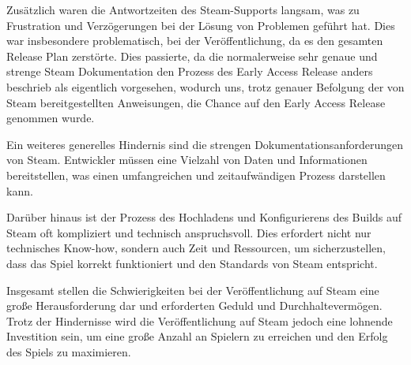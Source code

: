 Zusätzlich waren die Antwortzeiten des Steam-Supports langsam, was zu Frustration und Verzögerungen bei der Lösung von Problemen geführt hat.
Dies war insbesondere problematisch, bei der Veröffentlichung, da es den gesamten Release Plan zerstörte.
Dies passierte, da die normalerweise sehr genaue und strenge Steam Dokumentation den Prozess des Early Access Release anders beschrieb als eigentlich vorgesehen, wodurch uns, trotz genauer Befolgung der von Steam bereitgestellten Anweisungen, die Chance auf den Early Access Release genommen wurde.

Ein weiteres generelles Hindernis sind die strengen Dokumentationsanforderungen von Steam.
Entwickler müssen eine Vielzahl von Daten und Informationen bereitstellen, was einen umfangreichen und zeitaufwändigen Prozess darstellen kann.

Darüber hinaus ist der Prozess des Hochladens und Konfigurierens des Builds auf Steam oft kompliziert und technisch anspruchsvoll.
Dies erfordert nicht nur technisches Know-how, sondern auch Zeit und Ressourcen, um sicherzustellen, dass das Spiel korrekt funktioniert und den Standards von Steam entspricht.

Insgesamt stellen die Schwierigkeiten bei der Veröffentlichung auf Steam eine große Herausforderung dar und erforderten Geduld und Durchhaltevermögen.
Trotz der Hindernisse wird die Veröffentlichung auf Steam jedoch eine lohnende Investition sein, um eine große Anzahl an Spielern zu erreichen und den Erfolg des Spiels zu maximieren.



%

\renewcommand{\kapitelautor}{}